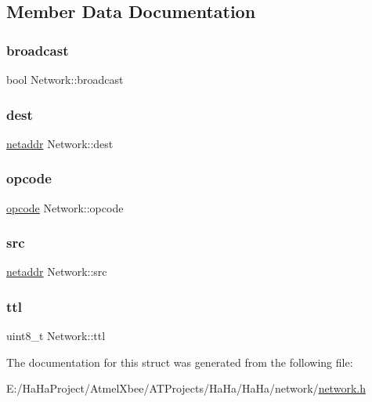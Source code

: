 \subsection{Member Data Documentation}
\mbox{\label{struct_network_a32536a76f2f24b4698231a165fdd26a8}} 
\subsubsection{\texorpdfstring{broadcast}{broadcast}}
{\footnotesize\ttfamily bool Network\+::broadcast}

\mbox{\label{struct_network_afdd665550f4249de0fe44a6873c106d5}} 
\subsubsection{\texorpdfstring{dest}{dest}}
{\footnotesize\ttfamily \hyperlink{network_8h_a1924fa1e3480e5fb3c72b8ef3e243f57}{netaddr} Network\+::dest}

\mbox{\label{struct_network_a7dbabb0a4769aa2988ea4c164ce337a3}} 
\subsubsection{\texorpdfstring{opcode}{opcode}}
{\footnotesize\ttfamily \hyperlink{packet_8h_a5ce68aceddf17a30aa045fc04914e798}{opcode} Network\+::opcode}

\mbox{\label{struct_network_aea4b9cff07746e6716d666b8f30206c3}} 
\subsubsection{\texorpdfstring{src}{src}}
{\footnotesize\ttfamily \hyperlink{network_8h_a1924fa1e3480e5fb3c72b8ef3e243f57}{netaddr} Network\+::src}

\mbox{\label{struct_network_ae8a4e88963892ccee2ef2c239bb3db96}} 
\subsubsection{\texorpdfstring{ttl}{ttl}}
{\footnotesize\ttfamily uint8\+\_\+t Network\+::ttl}



The documentation for this struct was generated from the following file\+:\begin{DoxyCompactItemize}
\item 
E\+:/\+Ha\+Ha\+Project/\+Atmel\+Xbee/\+A\+T\+Projects/\+Ha\+Ha/\+Ha\+Ha/network/\hyperlink{network_8h}{network.\+h}\end{DoxyCompactItemize}
